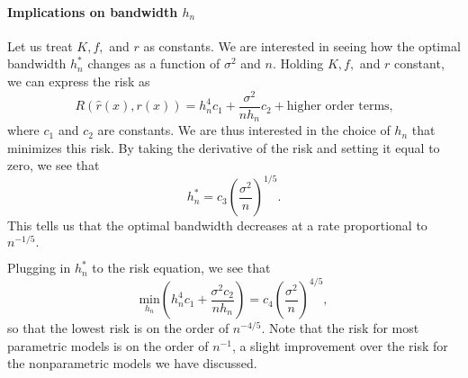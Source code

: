 \paragraph{Implications on bandwidth $h_n$}
Let us treat $K, f,$ and $r$ as constants. We are interested in seeing how the optimal bandwidth $h_n^*$ changes as a function of $\sigma^2$ and $n$. Holding $K, f,$ and $r$ constant, we can express the risk as 
\begin{equation} R(\hat r(x), r(x)) = h_n^4 c_1 + \frac{\sigma^2}{nh_n}c_2 + \text{higher order terms,}\end{equation} 
where $c_1$ and $c_2$ are constants. We are thus interested in the choice of $h_n$ that minimizes this risk. By taking the derivative of the risk and setting it equal to zero, we see that
\begin{equation}
	h_n^* = c_3\left(\frac{\sigma^2}{n}\right)^{1/5}.
\end{equation}
This tells us that the optimal bandwidth decreases at a rate proportional to $n^{-1/5}.$ 

Plugging in $h_n^*$ to the risk equation, we see that \begin{equation}
	\underset{h_n}{\text{min}}\left(h_n^4 c_1 + \frac{\sigma^2 c_2}{nh_n}\right) = c_4 \left(\frac{\sigma^2}{n}\right)^{4/5},
\end{equation}
so that the lowest risk is on the order of $n^{-4/5}$. Note that the risk for most parametric models is on the order of $n^{-1}$, a slight improvement over the risk for the nonparametric models we have discussed. 

